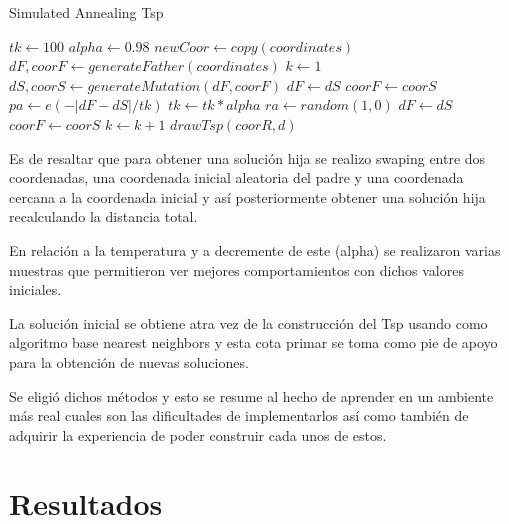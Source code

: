 \documentclass{article}
\begin{document}
\begin{algorithm}[H]
	\caption{Simulated Annealing Tsp}\label{SimulatedAnnealingTsp}
	\begin{algorithmic}[1]
		\State $tk \gets 100$
		\State $alpha \gets 0.98$
		\State $newCoor \gets copy(coordinates)$
		\State $dF, coorF \gets generateFather(coordinates)$ 
		\State $k \gets 1$ 
		\State $dS, coorS \gets generateMutation(dF, coorF)$ 
		 
		\State $dF \gets dS$
		\State $coorF \gets coorS$
		\Else
		\State $pa \gets e (- \left | dF-dS \right | / tk)$
		\State $tk \gets tk * alpha$
		\State $ra \gets random(1, 0)$
		\State $dF \gets dS$
		\State $coorF \gets coorS$
		\EndIf
		\EndIf
		\State $k \gets k+1$
		\EndWhile\label{euclidendwhile}
		\State $drawTsp(coorR, d)$ 
		\EndProcedure
	\end{algorithmic}
\end{algorithm}

Es de resaltar que para obtener una solución hija se realizo swaping entre dos coordenadas, una coordenada inicial aleatoria del padre y una coordenada cercana a la coordenada inicial y así posteriormente obtener una solución hija recalculando la distancia total.

En relación a la temperatura y a decremente de este (alpha) se realizaron varias muestras que permitieron ver mejores comportamientos con dichos valores iniciales.

La solución inicial se obtiene atra vez de la construcción del Tsp usando como algoritmo base nearest neighbors y esta cota primar se toma como pie de apoyo para la obtención de nuevas soluciones.

Se eligió dichos métodos y esto se resume al hecho de aprender en un ambiente más real cuales son las dificultades de implementarlos así como también de adquirir la experiencia de poder construir cada unos de estos.

\section{Resultados}
\end{document}
